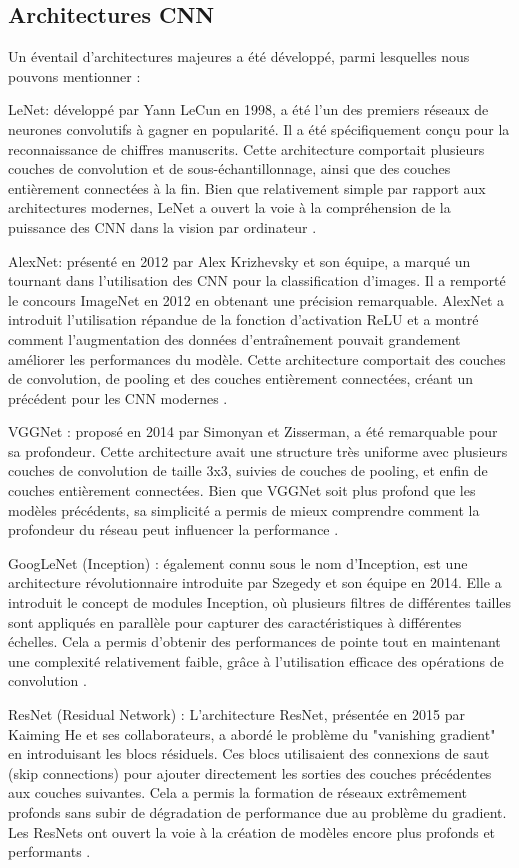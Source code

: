 \subsection{Architectures CNN}
Un éventail d'architectures majeures a été développé, parmi lesquelles nous pouvons mentionner :
\begin{outline}
\1 LeNet: développé par Yann LeCun en 1998, a été l'un des premiers réseaux de neurones convolutifs à gagner en popularité. Il a été spécifiquement conçu pour la reconnaissance de chiffres manuscrits. Cette architecture comportait plusieurs couches de convolution et de sous-échantillonnage, ainsi que des couches entièrement connectées à la fin. Bien que relativement simple par rapport aux architectures modernes, LeNet a ouvert la voie à la compréhension de la puissance des CNN dans la vision par ordinateur \cite{vitalflux2023different}.

\1 AlexNet: présenté en 2012 par Alex Krizhevsky et son équipe, a marqué un tournant dans l'utilisation des CNN pour la classification d'images. Il a remporté le concours ImageNet en 2012 en obtenant une précision remarquable. AlexNet a introduit l'utilisation répandue de la fonction d'activation ReLU et a montré comment l'augmentation des données d'entraînement pouvait grandement améliorer les performances du modèle. Cette architecture comportait des couches de convolution, de pooling et des couches entièrement connectées, créant un précédent pour les CNN modernes \cite{vitalflux2023different}.

\1 VGGNet : proposé en 2014 par Simonyan et Zisserman, a été remarquable pour sa profondeur. Cette architecture avait une structure très uniforme avec plusieurs couches de convolution de taille 3x3, suivies de couches de pooling, et enfin de couches entièrement connectées. Bien que VGGNet soit plus profond que les modèles précédents, sa simplicité a permis de mieux comprendre comment la profondeur du réseau peut influencer la performance \cite{analyticsvidhya2019vggnet}.

\1 GoogLeNet (Inception) : également connu sous le nom d'Inception, est une architecture révolutionnaire introduite par Szegedy et son équipe en 2014. Elle a introduit le concept de modules Inception, où plusieurs filtres de différentes tailles sont appliqués en parallèle pour capturer des caractéristiques à différentes échelles. Cela a permis d'obtenir des performances de pointe tout en maintenant une complexité relativement faible, grâce à l'utilisation efficace des opérations de convolution \cite{medium-article}.

\1 ResNet (Residual Network) : L'architecture ResNet, présentée en 2015 par Kaiming He et ses collaborateurs, a abordé le problème du "vanishing gradient" en introduisant les blocs résiduels. Ces blocs utilisaient des connexions de saut (skip connections) pour ajouter directement les sorties des couches précédentes aux couches suivantes. Cela a permis la formation de réseaux extrêmement profonds sans subir de dégradation de performance due au problème du gradient. Les ResNets ont ouvert la voie à la création de modèles encore plus profonds et performants \cite{geeksforgeeks-resnet}.
\end{outline}

